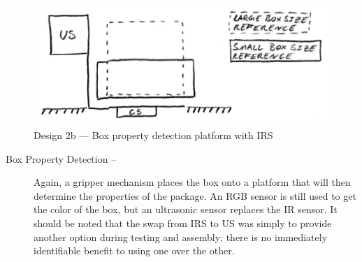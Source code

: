 \documentclass[11pt]{report}
\begin{document}
\begin{figure}[H]
    \centering
    \hspace*{6em}
    \includegraphics[width=0.6\linewidth]{Images//Designs/Design2b.pdf}
    \caption{Design 2b --- Box property detection platform with IRS}
    \label{fig:design2b}
\end{figure}
\begin{description}
    \item[Box Property Detection --]Again, a gripper mechanism places the box onto a platform that will then determine the properties of the package. An \gls{RGB} sensor is still used to get the color of the box, but an ultrasonic sensor replaces the \gls{IR} sensor. It should be noted that the swap from \gls{IRS} to \gls{US} was simply to provide another option during testing and assembly; there is no immediately identifiable benefit to using one over the other.
\end{description}

\newpage
\end{document}
